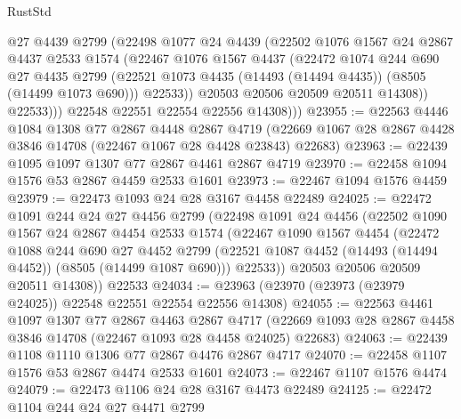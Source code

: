 \begin{lexlean}{RustStd}
\begin{coremodule}
                @27
                @4439
                @2799
                (@22498
                  @1077
                  @24
                  @4439
                  (@22502
                    @1076
                    @1567
                    @24
                    @2867
                    @4437
                    @2533
                    @1574
                    (@22467
                      @1076
                      @1567
                      @4437
                      (@22472
                        @1074
                        @244
                        @690
                        @27
                        @4435
                        @2799
                        (@22521 @1073 @4435 (@14493 (@14494 @4435)) (@8505 (@14499 @1073 @690)))
                        @22533))
                    @20503
                    @20506
                    @20509
                    @20511
                    @14308))
                @22533)))
          @22548
          @22551
          @22554
          @22556
          @14308)))
@23955 := @22563
    @4446
    @1084
    @1308
    @77
    @2867
    @4448
    @2867
    @4719
    (@22669 @1067 @28 @2867 @4428 @3846 @14708 (@22467 @1067 @28 @4428 @23843) @22683)
@23963 := @22439 @1095 @1097 @1307 @77 @2867 @4461 @2867 @4719
@23970 := @22458 @1094 @1576 @53 @2867 @4459 @2533 @1601
@23973 := @22467 @1094 @1576 @4459
@23979 := @22473 @1093 @24 @28 @3167 @4458 @22489
@24025 := @22472
    @1091
    @244
    @24
    @27
    @4456
    @2799
    (@22498
      @1091
      @24
      @4456
      (@22502
        @1090
        @1567
        @24
        @2867
        @4454
        @2533
        @1574
        (@22467
          @1090
          @1567
          @4454
          (@22472
            @1088
            @244
            @690
            @27
            @4452
            @2799
            (@22521 @1087 @4452 (@14493 (@14494 @4452)) (@8505 (@14499 @1087 @690)))
            @22533))
        @20503
        @20506
        @20509
        @20511
        @14308))
    @22533
@24034 := @23963 (@23970 (@23973 (@23979 @24025)) @22548 @22551 @22554 @22556 @14308)
@24055 := @22563
    @4461
    @1097
    @1307
    @77
    @2867
    @4463
    @2867
    @4717
    (@22669 @1093 @28 @2867 @4458 @3846 @14708 (@22467 @1093 @28 @4458 @24025) @22683)
@24063 := @22439 @1108 @1110 @1306 @77 @2867 @4476 @2867 @4717
@24070 := @22458 @1107 @1576 @53 @2867 @4474 @2533 @1601
@24073 := @22467 @1107 @1576 @4474
@24079 := @22473 @1106 @24 @28 @3167 @4473 @22489
@24125 := @22472
    @1104
    @244
    @24
    @27
    @4471
    @2799

\end{coremodule}
\end{lexlean}
